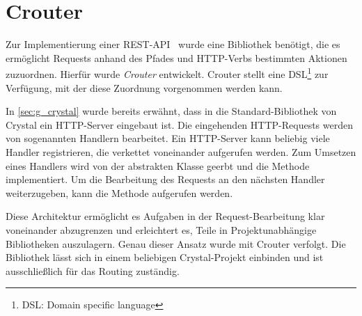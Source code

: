 \section{Crouter}
\label{sec:b_crouter}

Zur Implementierung einer REST-API~\cite{rest} wurde eine Bibliothek benötigt,
die es ermöglicht Requests anhand des Pfades und HTTP-Verbs bestimmten Aktionen
zuzuordnen.  Hierfür wurde \emph{Crouter} entwickelt.  Crouter stellt eine
DSL\footnote{DSL: Domain specific language} zur Verfügung, mit der diese
Zuordnung vorgenommen werden kann.

In \cref{sec:g_crystal} wurde bereits erwähnt, dass in die Standard-Bibliothek
von Crystal ein HTTP-Server eingebaut ist.  Die eingehenden HTTP-Requests
werden von sogenannten Handlern bearbeitet.  Ein HTTP-Server kann beliebig
viele Handler registrieren, die verkettet voneinander aufgerufen werden.  Zum
Umsetzen eines Handlers wird von der abstrakten Klasse 
geerbt und die Methode  implementiert.  Um die Bearbeitung
des Requests an den nächsten Handler weiterzugeben, kann die Methode
 aufgerufen werden.

Diese Architektur ermöglicht es Aufgaben in der
Request-Bearbeitung klar voneinander abzugrenzen und erleichtert es, Teile in
Projektunabhängige Bibliotheken auszulagern.  Genau dieser Ansatz wurde mit
Crouter verfolgt.  Die Bibliothek lässt sich in einem beliebigen
Crystal-Projekt einbinden und ist ausschließlich für das Routing zuständig.




